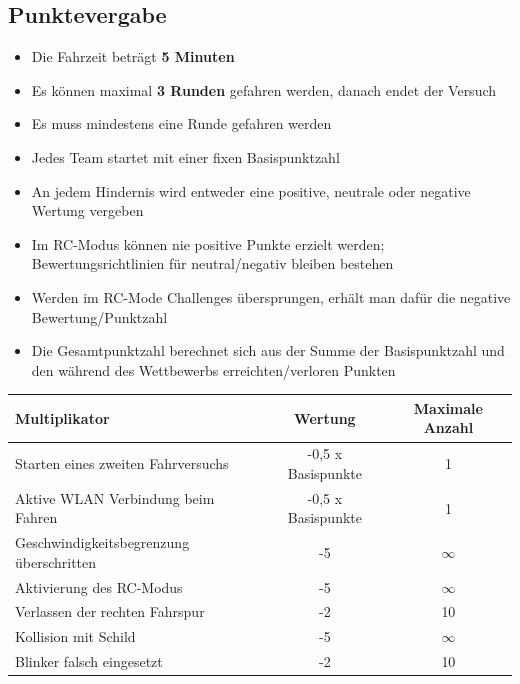 \documentclass[a4paper, 11pt,usegeometry]{scrartcl}
\begin{document}
\subsection*{Punktevergabe}
\begin{itemize}
  \item Die Fahrzeit beträgt \textbf{5 Minuten}
  \item Es können maximal \textbf{3 Runden} gefahren werden, danach endet der Versuch
  \item Es muss mindestens eine Runde gefahren werden
  \item Jedes Team startet mit einer fixen Basispunktzahl
  \item An jedem Hindernis wird entweder eine positive, neutrale oder negative Wertung vergeben
  \item Im RC-Modus können nie positive Punkte erzielt werden; Bewertungsrichtlinien für
  neutral/negativ bleiben bestehen
  \item Werden im RC-Mode Challenges übersprungen, erhält man dafür die negative Bewertung/Punktzahl
  \item Die Gesamtpunktzahl berechnet sich aus der Summe der Basispunktzahl und den während des Wettbewerbs erreichten/verloren Punkten
\end{itemize}


\begin{table}[H]
\begin{tabular}{|p{}|c|c|}
\hline
\rowcolor[HTML]{CACACA} 
\textbf{Multiplikator}                 & \textbf{Wertung} & \textbf{Maximale Anzahl} \\ \hline
Starten eines zweiten Fahrversuchs     & -0,5 x Basispunkte & 1                      \\ \hline
Aktive WLAN Verbindung beim Fahren     & -0,5 x Basispunkte & 1                      \\ \hline
Geschwindigkeitsbegrenzung überschritten & -5             & $\infty$                 \\ \hline
Aktivierung des RC-Modus               & -5               & $\infty$                 \\ \hline
Verlassen der rechten Fahrspur         & -2               & 10                       \\ \hline
Kollision mit Schild                   & -5               & $\infty$                 \\ \hline
Blinker falsch eingesetzt              & -2               & 10                       \\ \hline
\end{tabular}
\end{table}
\end{document}
